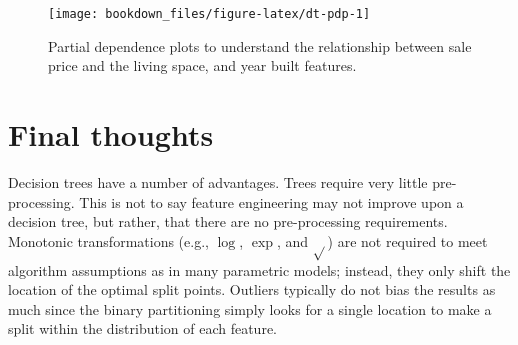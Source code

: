 \documentclass[]{krantz}
\makeatletter
\newenvironment{Shaded}{\begin{snugshade}}{\end{snugshade}}
\newcommand{\CommentTok}[1]{\textcolor[rgb]{0.37,0.37,0.37}{\textit{#1}}}
\newcommand{\DataTypeTok}[1]{\textcolor[rgb]{0.27,0.27,0.27}{#1}}
\newcommand{\DecValTok}[1]{\textcolor[rgb]{0.06,0.06,0.06}{#1}}
\newcommand{\KeywordTok}[1]{\textcolor[rgb]{0.27,0.27,0.27}{\textbf{#1}}}
\newcommand{\NormalTok}[1]{#1}
\newcommand{\OperatorTok}[1]{\textcolor[rgb]{0.43,0.43,0.43}{\textbf{#1}}}
\newcommand{\OtherTok}[1]{\textcolor[rgb]{0.37,0.37,0.37}{#1}}
\newcommand{\StringTok}[1]{\textcolor[rgb]{0.5,0.5,0.5}{#1}}
\newenvironment{kframe}{%
\medskip{}
\setlength{\fboxsep}{.8em}
 \def\at@end@of@kframe{}%
 \ifinner\ifhmode%
  \def\at@end@of@kframe{\end{minipage}}%
  \begin{minipage}{\columnwidth}%
 \fi\fi%
 \def\FrameCommand##1{\hskip\@totalleftmargin \hskip-\fboxsep
 \colorbox{shadecolor}{##1}\hskip-\fboxsep
     \hskip-\linewidth \hskip-\@totalleftmargin \hskip\columnwidth}%
 \MakeFramed {\advance\hsize-\width
   \@totalleftmargin\z@ \linewidth\hsize
   \@setminipage}}%
 {\par\unskip\endMakeFramed%
 \at@end@of@kframe}
\renewenvironment{Shaded}{\begin{kframe}}{\end{kframe}}
\makeatother
\begin{document}
\begin{Shaded}
\end{Shaded}

\begin{figure}

{\centering \texttt{[image: bookdown\_files/figure-latex/dt-pdp-1]} 

}

\caption{Partial dependence plots to understand the relationship between sale price and the living space, and year built features.}\label{fig:dt-pdp}
\end{figure}

\hypertarget{final-thoughts-5}{%
\section{Final thoughts}\label{final-thoughts-5}}

Decision trees have a number of advantages. Trees require very little pre-processing. This is not to say feature engineering may not improve upon a decision tree, but rather, that there are no pre-processing requirements. Monotonic transformations (e.g., \(\log\), \(\exp\), and \(\sqrt{}\)) are not required to meet algorithm assumptions as in many parametric models; instead, they only shift the location of the optimal split points. Outliers typically do not bias the results as much since the binary partitioning simply looks for a single location to make a split within the distribution of each feature.
\end{document}
